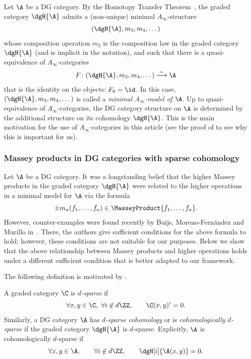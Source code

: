 \documentclass[a4paper]{amsart}
\begin{document}
Let $\A$ be a DG category. By the Homotopy Transfer Theorem~\cite{Kad80}, the
graded category $\dgH{\A}$ admits a (non-unique) minimal $A_\infty$-structure
\[
  (\dgH{\A},m_3,m_4,\dots)
\]
whose composition operation $m_2$ is the composition law in the graded category
$\dgH{\A}$ (and is implicit in the notation), and such that there is a
quasi-equivalence of $A_\infty$-categories
\[
  F\colon(\dgH{\A},m_3,m_4,\dots)\stackrel{\sim}{\longrightarrow}\A
\]
that is the identity on the objects: $F_0=\id$. In this case,
$(\dgH{\A},m_3,m_4,\dots)$ is called a \emph{minimal $A_\infty$-model of $\A$}.
Up to quasi-equivalence of $A_\infty$-categories, the DG category structure on
$\A$ is determined by the additional structure on its cohomology $\dgH{\A}$.
This is the main motivation for the use of $A_\infty$-categories in this article
(see the proof of  to see why this
is important for us).

\subsubsection{Massey products in DG categories with sparse cohomology}

Let $\A$ be a DG category. It was a longstanding belief that the higher Massey
products in the graded category $\dgH{\A}$ were related to the higher operations
in a minimal model for $\A$ via the formula
\[
  \pm m_n(f_1,\dots,f_n)\in\MasseyProduct{f_1,\dots,f_n}.
\]
However, counter-examples were found recently by Buijs, Moreno-Fern{\'a}ndez and
Murillo in~\cite{BMM20}. There, the authors give sufficient conditions for the
above formula to hold; however, these conditions are not suitable for our
purposes. Below we show that the above relationship between Massey products and
higher operations holds under a different sufficient condition that is better
adapted to our framework.

The following definition is motivated by .

\begin{definition}
  \label{def:sparse}
  A graded category $\C$ is \emph{$d$-sparse} if
  \[
    \forall x,y\in\C,\ \forall i\not\in d\ZZ,\qquad \C(x,y)^i=0.
  \]
  Similarly, a DG category $\A$ has \emph{$d$-sparse cohomology} or is 
  \emph{cohomologically $d$-sparse} if the graded category $\dgH{\A}$ is
  $d$-sparse. Explicitly, $\A$ is cohomologically $d$-sparse if
  \[
    \forall x,y\in\A,\qquad \forall i\not\in d\ZZ,\qquad \dgH[i]{\A(x,y)}=0.
  \]
\end{definition}
\end{document}
